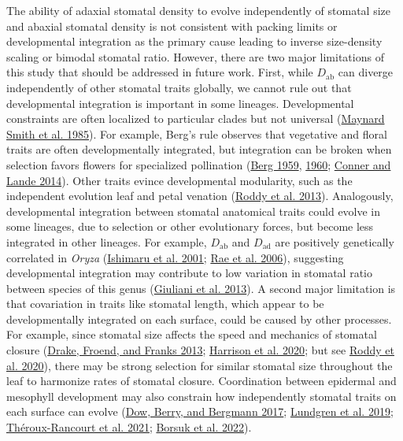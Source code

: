 \documentclass[
  12pt,
]{article}
\begin{document}
The ability of adaxial stomatal density to evolve independently of stomatal size and abaxial stomatal density is not consistent with packing limits or developmental integration as the primary cause leading to inverse size-density scaling or bimodal stomatal ratio. However, there are two major limitations of this study that should be addressed in future work. First, while \(D_\text{ab}\) can diverge independently of other stomatal traits globally, we cannot rule out that developmental integration is important in some lineages. Developmental constraints are often localized to particular clades but not universal (\protect\hyperlink{ref-maynard_smith_developmental_1985}{Maynard Smith et al. 1985}). For example, Berg's rule observes that vegetative and floral traits are often developmentally integrated, but integration can be broken when selection favors flowers for specialized pollination (\protect\hyperlink{ref-berg_general_1959}{Berg 1959}, \protect\hyperlink{ref-berg_ecological_1960}{1960}; \protect\hyperlink{ref-conner_raissa_2014}{Conner and Lande 2014}). Other traits evince developmental modularity, such as the independent evolution leaf and petal venation (\protect\hyperlink{ref-roddy_uncorrelated_2013}{Roddy et al. 2013}). Analogously, developmental integration between stomatal anatomical traits could evolve in some lineages, due to selection or other evolutionary forces, but become less integrated in other lineages. For example, \(D_\text{ab}\) and \(D_\text{ad}\) are positively genetically correlated in \emph{Oryza} (\protect\hyperlink{ref-ishimaru_identification_2001}{Ishimaru et al. 2001}; \protect\hyperlink{ref-rae_elucidating_2006}{Rae et al. 2006}), suggesting developmental integration may contribute to low variation in stomatal ratio between species of this genus (\protect\hyperlink{ref-giuliani_coordination_2013}{Giuliani et al. 2013}). A second major limitation is that covariation in traits like stomatal length, which appear to be developmentally integrated on each surface, could be caused by other processes. For example, since stomatal size affects the speed and mechanics of stomatal closure (\protect\hyperlink{ref-drake_smaller_2013}{Drake, Froend, and Franks 2013}; \protect\hyperlink{ref-harrison_influence_2020}{Harrison et al. 2020}; but see \protect\hyperlink{ref-roddy_scaling_2020}{Roddy et al. 2020}), there may be strong selection for similar stomatal size throughout the leaf to harmonize rates of stomatal closure. Coordination between epidermal and mesophyll development may also constrain how independently stomatal traits on each surface can evolve (\protect\hyperlink{ref-dow_disruption_2017}{Dow, Berry, and Bergmann 2017}; \protect\hyperlink{ref-lundgren_mesophyll_2019}{Lundgren et al. 2019}; \protect\hyperlink{ref-theroux-rancourt_maximum_2021}{Théroux-Rancourt et al. 2021}; \protect\hyperlink{ref-borsuk_structural_2022}{Borsuk et al. 2022}).
\end{document}
